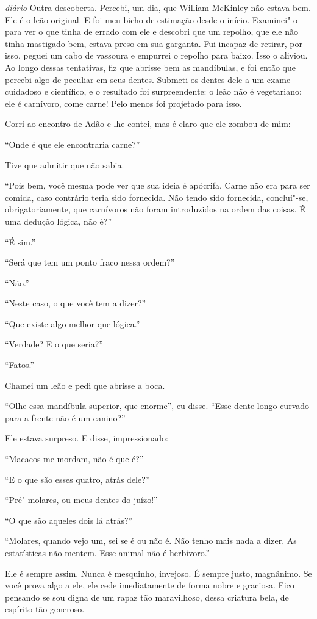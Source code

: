 \textit{diário} Outra descoberta. Percebi, um dia, que William McKinley não estava bem. Ele
é o leão original. E foi meu bicho de estimação desde o início. Examinei"-o para
ver o que tinha de errado com ele e descobri que um repolho, que ele não tinha
mastigado bem, estava preso em sua garganta. Fui incapaz de retirar, por isso, peguei um
cabo de vassoura e empurrei o repolho para baixo. Isso o aliviou. Ao longo
dessas tentativas, fiz que abrisse bem as mandíbulas, e foi então que percebi
algo de peculiar em seus dentes. Submeti os dentes dele a um exame cuidadoso e
científico, e o resultado foi surpreendente: o leão não é vegetariano; ele é
carnívoro, come carne! Pelo menos foi projetado para isso.

Corri ao encontro de Adão e lhe contei, mas é claro que ele zombou de mim:

“Onde é que ele encontraria carne?”

Tive que admitir que não sabia.

“Pois bem, você mesma pode ver que sua ideia é apócrifa. Carne não era para ser
comida, caso contrário teria sido fornecida. Não tendo sido fornecida,
conclui"-se, obrigatoriamente, que carnívoros não foram introduzidos na ordem das
coisas. É uma dedução lógica, não é?”

“É sim.”

“Será que tem um ponto fraco nessa ordem?”

“Não.”

“Neste caso, o que você tem a dizer?”

“Que existe algo melhor que lógica.”

“Verdade? E o que seria?”

``Fatos.''

Chamei um leão e pedi que abrisse a boca.

``Olhe essa mandíbula superior, que enorme'', eu disse. “Esse dente longo curvado
para a frente não é um canino?”

Ele estava surpreso. E disse, impressionado:

“Macacos me mordam, não é que é?”

“E o que são esses quatro, atrás dele?”

“Pré"-molares, ou meus dentes do juízo!”

“O que são aqueles dois lá atrás?”

“Molares, quando vejo um, sei se é ou não é. Não tenho mais nada a dizer. As
estatísticas não mentem. Esse animal não é herbívoro.”

Ele é sempre assim. Nunca é mesquinho, invejoso. É sempre justo, magnânimo. Se você
prova algo a ele, ele cede imediatamente de forma nobre e graciosa. Fico pensando se
sou digna de um rapaz tão maravilhoso, dessa criatura bela, de espírito tão
generoso.

